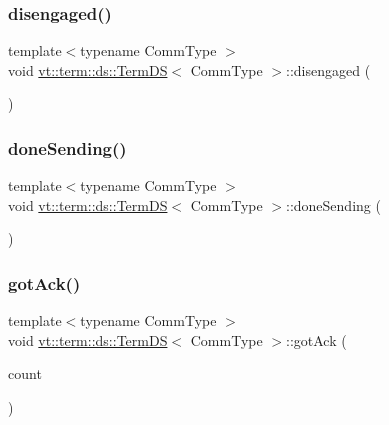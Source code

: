 \subsubsection{\texorpdfstring{disengaged()}{disengaged()}}
{\footnotesize\ttfamily template$<$typename Comm\+Type $>$ \\
void \hyperlink{structvt_1_1term_1_1ds_1_1_term_d_s}{vt\+::term\+::ds\+::\+Term\+DS}$<$ Comm\+Type $>$\+::disengaged (\begin{DoxyParamCaption}{ }\end{DoxyParamCaption})}

\mbox{\label{structvt_1_1term_1_1ds_1_1_term_d_s_a9723c6b5db4318277329570e0974e1c7}} 
\subsubsection{\texorpdfstring{done\+Sending()}{doneSending()}}
{\footnotesize\ttfamily template$<$typename Comm\+Type $>$ \\
void \hyperlink{structvt_1_1term_1_1ds_1_1_term_d_s}{vt\+::term\+::ds\+::\+Term\+DS}$<$ Comm\+Type $>$\+::done\+Sending (\begin{DoxyParamCaption}{ }\end{DoxyParamCaption})}

\mbox{\label{structvt_1_1term_1_1ds_1_1_term_d_s_a6fcd87a189c046c48c341f39f9ea0b69}} 
\subsubsection{\texorpdfstring{got\+Ack()}{gotAck()}}
{\footnotesize\ttfamily template$<$typename Comm\+Type $>$ \\
void \hyperlink{structvt_1_1term_1_1ds_1_1_term_d_s}{vt\+::term\+::ds\+::\+Term\+DS}$<$ Comm\+Type $>$\+::got\+Ack (\begin{DoxyParamCaption}\item[{\hyperlink{structvt_1_1term_1_1ds_1_1_term_d_s_a54f4ebd7e1ecb59c32c0f5b03ef9f20b}{Count\+Type}}]{count }\end{DoxyParamCaption})}

